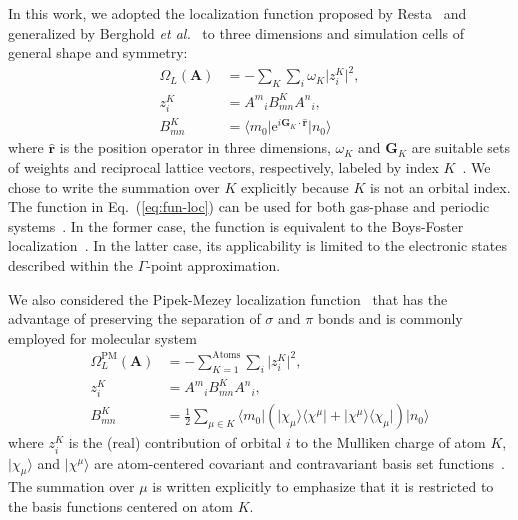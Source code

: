\documentclass[aps,prl,reprint,amsmath,amssymb]{revtex4-1}
\newcommand*{\imi}{i} %
\newcommand*{\E}{\mathrm{e}}
\newcommand{\ket}[1]{\ensuremath{\vert #1 \rangle}}
\newcommand{\bra}[1]{\ensuremath{\langle #1 \vert}}
\newcommand{\ketbra}[2]{\ensuremath{\vert #1 \rangle \langle #2 \vert}} %
\newcommand{\op}[1]{\ensuremath{\hat{#1}}} %
\begin{document}
In this work, we adopted the localization function proposed by Resta~\cite{resta1998quantum, resta1999electron} and generalized by Berghold \emph{et al.}~\cite{berghold2000general} to three dimensions and simulation cells of general shape and symmetry: 
%
\begin{equation} \label{eq:fun-loc}
\begin{split}
\Omega_L(\mathbf{A}) &= - \sum_K \sum_i \omega_K \vert z_{i}^{K} \vert^2, \\
z_{i}^{K} &= {A^m}_i B^{K}_{mn} {A^n}_i, \\
B^{K}_{mn} &= \bra{m_0} \E^{\imi \mathbf{G}_K \cdot \mathbf{\op{r}}} \ket{n_0}
\end{split}
\end{equation}
%
where $\mathbf{\op{r}}$ is the position operator in three dimensions, $\omega_K$ and $\mathbf{G}_K$ are suitable sets of weights and reciprocal lattice vectors, respectively, labeled by index $K$~\cite{silvestrelli1999maximally, berghold2000general}. We chose to write the summation over $K$ explicitly because $K$ is not an orbital index. The function in Eq.~(\ref{eq:fun-loc}) can be used for both gas-phase and periodic systems~\cite{berghold2000general}. In the former case, the function is equivalent to the Boys-Foster localization~\cite{berghold2000general, resta1999electron}. In the latter case, its applicability is limited to the electronic states described within the $\Gamma$-point approximation.

We also considered the Pipek-Mezey localization function~\cite{pipek1989fast,lehtola2014pipek} that has the advantage of preserving the separation of $\sigma$ and $\pi$ bonds and is commonly employed for molecular system
%
\begin{equation} \label{eq:pipek}
\begin{split}
\Omega_L^{\text{PM}}(\mathbf{A}) &= - \sum_{K=1}^{\text{Atoms}} \sum_i \vert z_{i}^{K} \vert^2, \\
z_{i}^{K} &= {A^m}_i B^{K}_{mn} {A^n}_i, \\
B^{K}_{mn} &= \frac{1}{2} \sum_{\mu \in K} \bra{m_0}  \left( \ketbra{\chi_{\mu}}{\chi^{\mu}} + \ketbra{\chi^{\mu}}{\chi_{\mu}} \right) \ket{n_0}
\end{split}
\end{equation}
%
%
where $z_{i}^{K}$ is the (real) contribution of orbital $i$ to the Mulliken charge of atom $K$, $\ket{\chi_\mu}$ and $\ket{\chi^\mu}$ are atom-centered covariant and contravariant basis set functions~\cite{silvestrelli1999maximally, berghold2000general}. The summation over $\mu$ is written explicitly to emphasize that it is restricted to the basis functions centered on atom $K$. 
\end{document}
